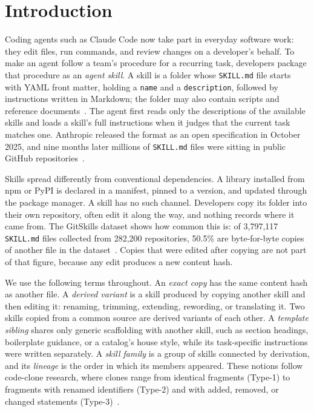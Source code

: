 \section{Introduction}
\label{sec:intro}

Coding agents such as Claude Code now take part in everyday software work: they edit
files, run commands, and review changes on a developer's behalf. To make an agent follow a
team's procedure for a recurring task, developers package that procedure as an
\emph{agent skill}. A skill is a folder whose \texttt{SKILL.md} file starts with YAML front
matter, holding a \texttt{name} and a \texttt{description}, followed by instructions written
in Markdown; the folder may also contain scripts and reference documents~\cite{agentskills_spec,
destefanis2027gitskills}. The agent first reads only the descriptions of the available skills
and loads a skill's full instructions when it judges that the current task matches one.
Anthropic released the format as an open specification in October 2025, and nine months
later millions of \texttt{SKILL.md} files were sitting in public GitHub
repositories~\cite{destefanis2027gitskills}.

Skills spread differently from conventional dependencies. A library installed from npm or
PyPI is declared in a manifest, pinned to a version, and updated through the package manager.
A skill has no such channel. Developers copy its folder into their own repository, often edit
it along the way, and nothing records where it came from. The GitSkills dataset shows how
common this is: of 3,797,117 \texttt{SKILL.md} files collected from 282,200 repositories,
50.5\% are byte-for-byte copies of another file in the dataset~\cite{destefanis2027gitskills}.
Copies that were edited after copying are not part of that figure, because any edit produces
a new content hash.

We use the following terms throughout. An \emph{exact copy} has the same content hash as
another file. A \emph{derived variant} is a skill produced by copying another skill and then
editing it: renaming, trimming, extending, rewording, or translating it. Two skills copied
from a common source are derived variants of each other. A \emph{template sibling} shares only
generic scaffolding with another skill, such as section headings, boilerplate guidance, or a
catalog's house style, while its task-specific instructions were written separately. A
\emph{skill family} is a group of skills connected by derivation, and its \emph{lineage} is
the order in which its members appeared. These notions follow code-clone research, where
clones range from identical fragments (Type-1) to fragments with renamed identifiers
(Type-2) and with added, removed, or changed statements (Type-3)~\cite{roy2009comparison}.

